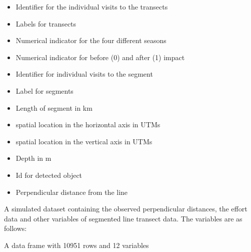 \documentclass[a4paper]{book}
\begin{document}
%
\begin{Details}\relax
\begin{itemize}

\item {} Identifier for the individual visits to the transects
\item {} Labels for transects
\item {} Numerical indicator for the four different seasons
\item {} Numerical indicator for before (0) and after (1) impact
\item {} Identifier for individual visits to the segment
\item {} Label for segments
\item {} Length of segment in km
\item {} spatial location in the horizontal axis in UTMs
\item {} spatial location in the vertical axis in UTMs
\item {} Depth in m
\item {} Id for detected object      
\item {} Perpendicular distance from the line

\end{itemize}

\end{Details}
%
\begin{Description}\relax
A simulated dataset containing the observed perpendicular distances, the effort data and other variables of 
segmented line transect data. The variables are as follows:
\end{Description}
%
\begin{Format}
A data frame with 10951 rows and 12 variables
\end{Format}
%
\end{document}
